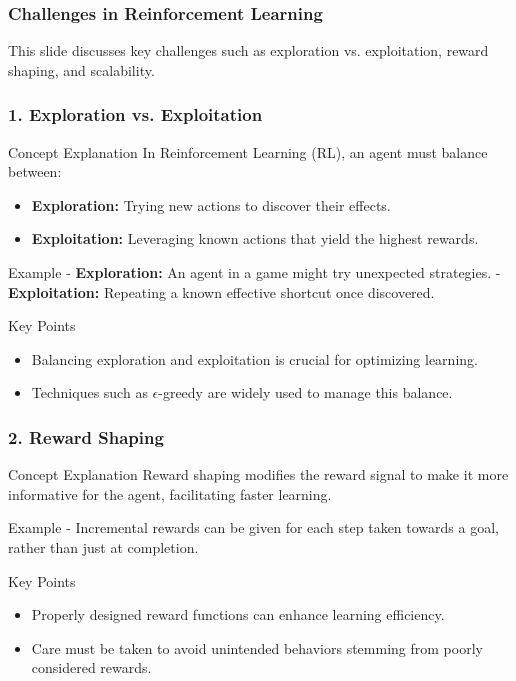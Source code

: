 \documentclass[aspectratio=169]{beamer}
\begin{document}
\begin{frame}[fragile]
    \frametitle{Challenges in Reinforcement Learning}
    This slide discusses key challenges such as exploration vs. exploitation, reward shaping, and scalability.
\end{frame}

\begin{frame}[fragile]
    \frametitle{1. Exploration vs. Exploitation}
    
    \begin{block}{Concept Explanation}
        In Reinforcement Learning (RL), an agent must balance between:
        \begin{itemize}
            \item \textbf{Exploration:} Trying new actions to discover their effects.
            \item \textbf{Exploitation:} Leveraging known actions that yield the highest rewards.
        \end{itemize}
    \end{block}

    \begin{block}{Example}
        - \textbf{Exploration:} An agent in a game might try unexpected strategies.
        - \textbf{Exploitation:} Repeating a known effective shortcut once discovered.
    \end{block}

    \begin{block}{Key Points}
        \begin{itemize}
            \item Balancing exploration and exploitation is crucial for optimizing learning.
            \item Techniques such as $\epsilon$-greedy are widely used to manage this balance.
        \end{itemize}
    \end{block}
\end{frame}

\begin{frame}[fragile]
    \frametitle{2. Reward Shaping}
    
    \begin{block}{Concept Explanation}
        Reward shaping modifies the reward signal to make it more informative for the agent, facilitating faster learning.
    \end{block}

    \begin{block}{Example}
        - Incremental rewards can be given for each step taken towards a goal, rather than just at completion.
    \end{block}

    \begin{block}{Key Points}
        \begin{itemize}
            \item Properly designed reward functions can enhance learning efficiency.
            \item Care must be taken to avoid unintended behaviors stemming from poorly considered rewards.
        \end{itemize}
    \end{block}
\end{frame}
\end{document}
